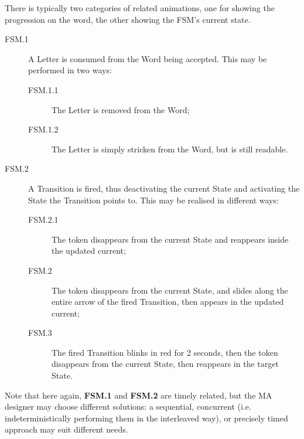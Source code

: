 There is typically two categories of related animations, one for showing the 
progression on the word, the other showing the FSM's current state. 
\begin{description}
   \item[FSM.1] A \textsf{Letter} is consumed from the \textsf{Word} being 
   accepted. This may be performed in two ways:
   \begin{description}
      \item[FSM.1.1] The \textsf{Letter} is removed from the \textsf{Word};
      \item[FSM.1.2] The \textsf{Letter} is simply stricken from the \textsf{Word},
      but is still readable.
   \end{description}
   \item[FSM.2] A \textsf{Transition} is fired, thus deactivating the current
   \textsf{State} and activating the \textsf{State} the \textsf{Transition} points to.
   This may be realised in different ways:
   \begin{description}
      \item[FSM.2.1] The token disappears from the \textsf{current} \textsf{State}
      and reappears inside the updated \textsf{current}; 
      \item[FSM.2] The token disappears from the \textsf{current} \textsf{State},
      and slides along the entire arrow of the fired \textsf{Transition}, then 
      appears in the updated \textsf{current};
      \item[FSM.3] The fired \textsf{Transition} blinks in red for 2 seconds,
      then the token disappears from the \textsf{current} \textsf{State},
      then reappears in the target \textsf{State}.
   \end{description}
\end{description}
Note that here again, \textbf{FSM.1} and \textbf{FSM.2} are timely related, but 
the MA designer may choose different solutions: a sequential, concurrent (i.e.
indeterministically performing them in the interleaved way), or precisely timed
approach may suit different needs.

